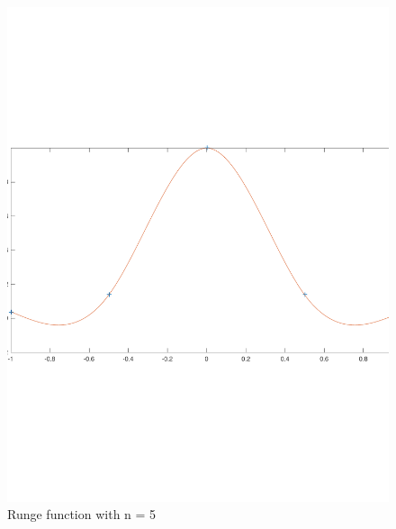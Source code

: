 \documentclass{article}
\begin{document}
\begin{figure}[h]
\centering
\caption{Runge function with n = 5}
\includegraphics[scale=0.6]{runge_n=5}
\end{figure}
\end{document}
